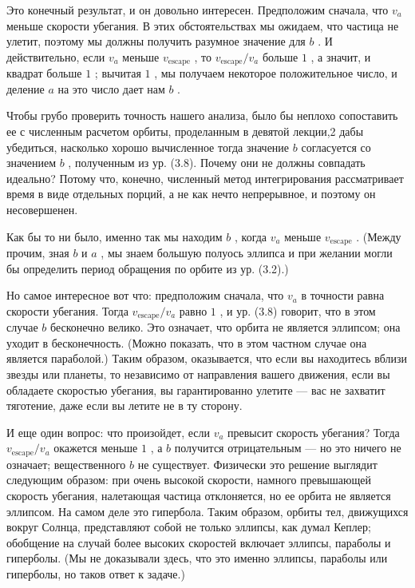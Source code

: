 \documentclass[11pt,oneside]{article}
\begin{document}
Это конечный результат, и он довольно интересен. Предположим сначала, что \(v_a\) меньше скорости убегания. В этих обстоятельствах мы ожидаем, что частица не улетит, поэтому мы должны получить разумное значение для \(b\) . И действительно, если \(v_a\) меньше \(v_\text{escape}\) , то \(v_\text{escape}/v_a\) больше \(1\) , а значит, и квадрат больше \(1\) ; вычитая \(1\) , мы получаем некоторое положительное число, и деление \(a\) на это число дает нам \(b\) .\par

Чтобы грубо проверить точность нашего анализа, было бы неплохо сопоставить ее с численным расчетом орбиты, проделанным в девятой лекции,2 дабы убедиться, насколько хорошо вычисленное тогда значение \(b\) согласуется со значением \(b\) , полученным из ур. (3.8). Почему они не должны совпадать идеально? Потому что, конечно, численный метод интегрирования рассматривает время в виде отдельных порций, а не как нечто непрерывное, и поэтому он несовершенен.\par

Как бы то ни было, именно так мы находим \(b\) , когда \(v_a\) меньше \(v_\text{escape}\) . (Между прочим, зная \(b\) и \(a\) , мы знаем большую полуось эллипса и при желании могли бы определить период обращения по орбите из ур. (3.2).)\par

Но самое интересное вот что: предположим сначала, что \(v_a\) в точности равна скорости убегания. Тогда \(v_\text{escape}/v_a\) равно \(1\) , и ур. (3.8) говорит, что в этом случае \(b\) бесконечно велико. Это означает, что орбита не является эллипсом; она уходит в бесконечность. (Можно показать, что в этом частном случае она является параболой.) Таким образом, оказывается, что если вы находитесь вблизи звезды или планеты, то независимо от направления вашего движения, если вы обладаете скоростью убегания, вы гарантированно улетите --- вас не захватит тяготение, даже если вы летите не в ту сторону.\par

И еще один вопрос: что произойдет, если \(v_a\) превысит скорость убегания? Тогда \(v_\text{escape}/v_a\) окажется меньше \(1\) , а \(b\) получится отрицательным --- но это ничего не означает; вещественного \(b\) не существует. Физически это решение выглядит следующим образом: при очень высокой скорости, намного превышающей скорость убегания, налетающая частица отклоняется, но ее орбита не является эллипсом. На самом деле это гипербола. Таким образом, орбиты тел, движущихся вокруг Солнца, представляют собой не только эллипсы, как думал Кеплер; обобщение на случай более высоких скоростей включает эллипсы, параболы и гиперболы. (Мы не доказывали здесь, что это именно эллипсы, параболы или гиперболы, но таков ответ к задаче.)\par
\end{document}
